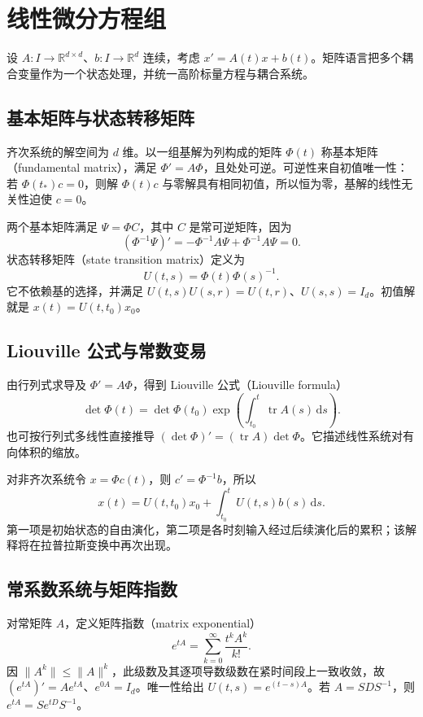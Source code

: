 \setcounter{chapter}{6} %
\chapter{线性微分方程组}
\label{chap:ode-linear-system}

设 $A:I\to\mathbb R^{d\times d}$、$b:I\to\mathbb R^d$ 连续，考虑 $x'=A(t)x+b(t)$。矩阵语言把多个耦合变量作为一个状态处理，并统一高阶标量方程与耦合系统。

\section{基本矩阵与状态转移矩阵}
齐次系统的解空间为 $d$ 维。以一组基解为列构成的矩阵 $\Phi(t)$ 称基本矩阵（fundamental matrix），满足 $\Phi'=A\Phi$，且处处可逆。可逆性来自初值唯一性：若 $\Phi(t_*)c=0$，则解 $\Phi(t)c$ 与零解具有相同初值，所以恒为零，基解的线性无关性迫使 $c=0$。

两个基本矩阵满足 $\Psi=\Phi C$，其中 $C$ 是常可逆矩阵，因为
\[
 (\Phi^{-1}\Psi)'=-\Phi^{-1}A\Psi+\Phi^{-1}A\Psi=0.
\]
状态转移矩阵（state transition matrix）定义为
\[
 U(t,s)=\Phi(t)\Phi(s)^{-1}.
\]
它不依赖基的选择，并满足 $U(t,s)U(s,r)=U(t,r)$、$U(s,s)=I_d$。初值解就是 $x(t)=U(t,t_0)x_0$。

\section{Liouville 公式与常数变易}
由行列式求导及 $\Phi'=A\Phi$，得到 Liouville 公式（Liouville formula）
\[
 \det\Phi(t)=\det\Phi(t_0)\exp\!\left(\int_{t_0}^t\operatorname{tr}A(s)\,\mathrm ds\right).
\]
也可按行列式多线性直接推导 $(\det\Phi)'=(\operatorname{tr}A)\det\Phi$。它描述线性系统对有向体积的缩放。

对非齐次系统令 $x=\Phi c(t)$，则 $c'=\Phi^{-1}b$，所以
\begin{equation}
 x(t)=U(t,t_0)x_0+\int_{t_0}^t U(t,s)b(s)\,\mathrm ds.
 \label{eq:ode-system-variation}
\end{equation}
第一项是初始状态的自由演化，第二项是各时刻输入经过后续演化后的累积；该解释将在拉普拉斯变换中再次出现。

\section{常系数系统与矩阵指数}
对常矩阵 $A$，定义矩阵指数（matrix exponential）
\[
 e^{tA}=\sum_{k=0}^\infty\frac{t^kA^k}{k!}.
\]
因 $\|A^k\|\leq\|A\|^k$，此级数及其逐项导数级数在紧时间段上一致收敛，故 $(e^{tA})'=Ae^{tA}$、$e^{0A}=I_d$。唯一性给出 $U(t,s)=e^{(t-s)A}$。若 $A=SDS^{-1}$，则 $e^{tA}=Se^{tD}S^{-1}$。

